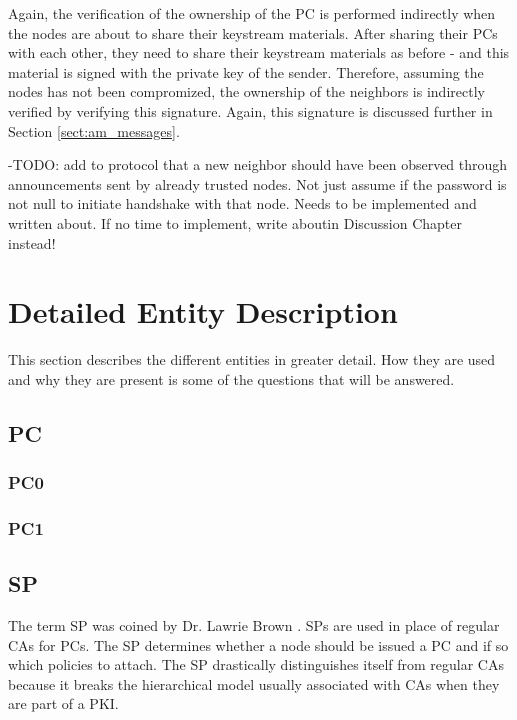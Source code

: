 Again, the verification of the ownership of the \ac{PC} is performed indirectly
when the nodes are about to share their keystream materials. After sharing their
\acp{PC} with each other, they need to share their keystream materials as before
- and this material is signed with the private key of the sender. Therefore,
assuming the nodes has not been compromized, the ownership of the neighbors is
indirectly verified by verifying this signature. Again, this signature is
discussed further in Section \ref{sect:am_messages}.

-TODO: add to protocol that a new neighbor should have been observed through
announcements sent by already trusted nodes. Not just assume if the password is
not null to initiate handshake with that node. Needs to be implemented and
written about. If no time to implement, write aboutin Discussion Chapter
instead!

\section{Detailed Entity Description}
This section describes the different entities in greater detail. How they are
used and why they are present is some of the questions that will be answered.

\subsection{\acf{PC}}


\subsubsection*{\acf{PC0}}

\subsubsection*{\acf{PC1}}

\subsection{\acf{SP}}
The term \acl{SP} was coined by Dr. Lawrie Brown \cite{lawrie:technotes}.
\acp{SP} are used in place of regular \acp{CA} for \acp{PC}. The \ac{SP}
determines whether a node should be issued a \ac{PC} and if so which policies to
attach. The \ac{SP} drastically distinguishes itself from regular \acp{CA}
because it breaks the hierarchical model usually associated with \acp{CA} when
they are part of a \ac{PKI}.

